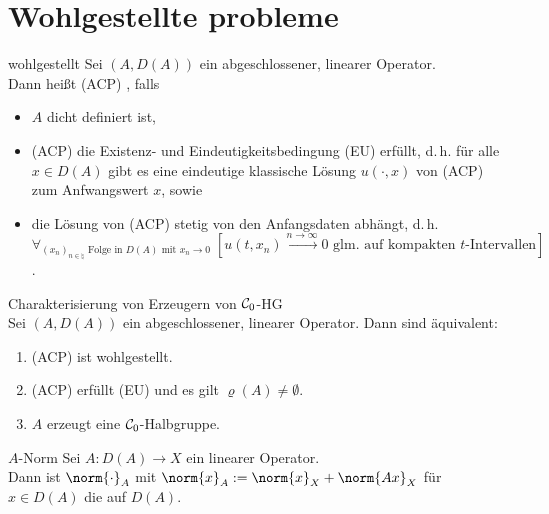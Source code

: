 \section{%
    Wohlgestellte probleme%
}

\begin{Def}{wohlgestellt}
    Sei $(A, D(A))$ ein abgeschlossener, linearer Operator.\\
    Dann heißt (ACP) , falls
    \begin{itemize}
        \item
        $A$ dicht definiert ist,

        \item
        (ACP) die Existenz- und Eindeutigkeitsbedingung (EU) erfüllt, d.\,h.
        für alle $x \in D(A)$ gibt es eine eindeutige klassische Lösung
        $u(\cdot, x)$ von (ACP) zum Anfwangswert $x$, sowie

        \item
        die Lösung von (ACP) stetig von den Anfangsdaten abhängt, d.\,h.\\
        $\forall_{\text{$(x_n)_{n \in \natural}$ Folge in $D(A)$ mit $x_n \to 0$}}\;
        [\text{$u(t, x_n) \xrightarrow{n \to \infty} 0$ glm. auf kompakten $t$-Intervallen}]$.
    \end{itemize}
\end{Def}

\begin{Satz}{Charakterisierung von Erzeugern von $\mathcal{C}_0$-HG}\\
    Sei $(A, D(A))$ ein abgeschlossener, linearer Operator.
    Dann sind äquivalent:
    \begin{enumerate}
        \item
        (ACP) ist wohlgestellt.

        \item
        (ACP) erfüllt (EU) und es gilt $\varrho(A) \not= \emptyset$.

        \item
        $A$ erzeugt eine $\mathcal{C}_0$-Halbgruppe.
    \end{enumerate}
\end{Satz}

\linie

\begin{Def}{$A$-Norm}
    Sei $A\colon D(A) \to X$ ein linearer Operator.\\
    Dann ist $\norm{\cdot}_A$ mit $\norm{x}_A := \norm{x}_X + \norm{Ax}_X$ für $x \in D(A)$
    die  auf $D(A)$.
\end{Def}

